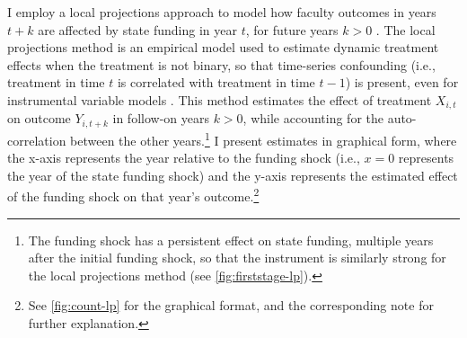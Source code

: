 I employ a local projections approach to model how faculty outcomes in years $t+k$ are affected by state funding in year $t$, for future years $k > 0$ \citep{jorda2005}.
The local projections method is an empirical model used to estimate dynamic treatment effects when the treatment is not binary, so that time-series confounding (i.e., treatment in time $t$ is correlated with treatment in time $t-1$) is present, even for instrumental variable models \citep{miller2022}.
This method estimates the effect of treatment $X_{i,t}$ on outcome $Y_{i, t+ k}$ in follow-on years $k > 0$, while accounting for the auto-correlation between the other years.\footnote{
    The funding shock has a persistent effect on state funding, multiple years after the initial funding shock, so that the instrument is similarly strong for the local projections method (see \autoref{fig:firststage-lp}).
}
I present estimates in graphical form, where the x-axis represents the year relative to the funding shock (i.e., $x = 0$ represents the year of the state funding shock) and the y-axis represents the estimated effect of the funding shock on that year's outcome.\footnote{
    See \autoref{fig:count-lp} for the graphical format, and the corresponding note for further explanation.
}
